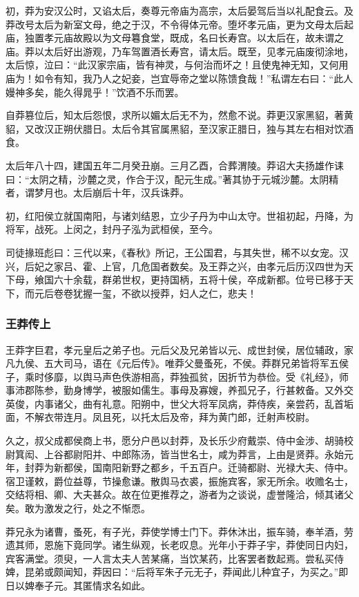 \documentclass[]{article}
\begin{document}
初，莽为安汉公时，又谄太后，奏尊元帝庙为高宗，太后晏驾后当以礼配食云。及莽改号太后为新室文母，绝之于汉，不令得体元帝。堕坏孝元庙，更为文母太后起庙，独置孝元庙故殿以为文母篹食堂，既成，名曰长寿宫。以太后在，故未谓之庙。莽以太后好出游观，乃车驾置酒长寿宫，请太后。既至，见孝元庙废彻涂地，太后惊，泣曰：``此汉家宗庙，皆有神灵，与何治而坏之！且使鬼神无知，又何用庙为！如令有知，我乃人之妃妾，岂宜辱帝之堂以陈馈食哉！''私谓左右曰：``此人嫚神多矣，能久得晁乎！''饮酒不乐而罢。

自莽篡位后，知太后怨恨，求所以媚太后无不为，然愈不说。莽更汉家黑貂，著黄貂，又改汉正朔伏腊日。太后令其官属黑貂，至汉家正腊日，独与其左右相对饮酒食。

太后年八十四，建国五年二月癸丑崩。三月乙酉，合葬渭陵。莽诏大夫扬雄作诔曰：``太阴之精，沙麓之灵，作合于汉，配元生成。''著其协于元城沙麓。太阴精者，谓梦月也。太后崩后十年，汉兵诛莽。

初，红阳侯立就国南阳，与诸刘结恩，立少子丹为中山太守。世祖初起，丹降，为将军，战死。上闵之，封丹子泓为武桓侯，至今。

司徒掾班彪曰：三代以来，《春秋》所记，王公国君，与其失世，稀不以女宠。汉兴，后妃之家吕、霍、上官，几危国者数矣。及王莽之兴，由孝元后历汉四世为天下母，飨国六十余载，群弟世权，更持国柄，五将十侯，卒成新都。位号已移于天下，而元后卷卷犹握一玺，不欲以授莽，妇人之仁，悲夫！

\hypertarget{header-n6732}{%
\subsubsection{王莽传上}\label{header-n6732}}

王莽字巨君，孝元皇后之弟子也。元后父及兄弟皆以元、成世封侯，居位辅政，家凡九侯、五大司马，语在《元后传》。唯莽父曼蚤死，不侯。莽群兄弟皆将军五侯子，乘时侈靡，以舆马声色佚游相高，莽独孤贫，因折节为恭俭。受《礼经》，师事沛郡陈参，勤身博学，被服如儒生。事母及寡嫂，养孤兄子，行甚敕备。又外交英俊，内事诸父，曲有礼意。阳朔中，世父大将军凤病，莽侍疾，亲尝药，乱首垢面，不解衣带连月。凤且死，以托太后及帝，拜为黄门郎，迁射声校尉。

久之，叔父成都侯商上书，愿分户邑以封莽，及长乐少府戴崇、侍中金涉、胡骑校尉箕闳、上谷都尉阳并、中郎陈汤，皆当世名士，咸为莽言，上由是贤莽。永始元年，封莽为新都侯，国南阳新野之都乡，千五百户。迁骑都尉、光禄大夫、侍中。宿卫谨敕，爵位益尊，节操愈谦。散舆马衣裘，振施宾客，家无所余。收赡名士，交结将相、卿、大夫甚众。故在位更推荐之，游者为之谈说，虚誉隆洽，倾其诸父矣。敢为激发之行，处之不惭恧。

莽兄永为诸曹，蚤死，有子光，莽使学博士门下。莽休沐出，振车骑，奉羊酒，劳遗其师，恩施下竟同学。诸生纵观，长老叹息。光年小于莽子宇，莽使同日内妇，宾客满堂。须臾，一人言太夫人苦某痛，当饮某药，比客罢者数起焉。尝私买侍婢，昆弟或颇闻知，莽因曰：``后将军朱子元无子，莽闻此儿种宜子，为买之。''即日以婢奉子元。其匿情求名如此。
\end{document}
